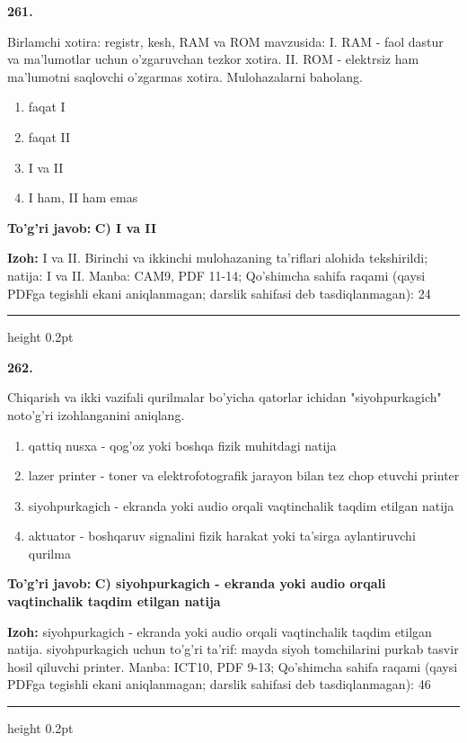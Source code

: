 \documentclass[10pt,a4paper]{article}
\begin{document}
{\bfseries\sffamily\color{ink} 261.}
\par
Birlamchi xotira: registr, kesh, RAM va ROM mavzusida: I. RAM - faol dastur va ma'lumotlar uchun o'zgaruvchan tezkor xotira. II. ROM - elektrsiz ham ma'lumotni saqlovchi o'zgarmas xotira. Mulohazalarni baholang.
\begin{enumerate}[label=\Alph*),leftmargin=9mm]
\item faqat I
\item faqat II
\item I va II
\item I ham, II ham emas
\end{enumerate}
\begin{tcolorbox}[enhanced,breakable,colback=teal!4,colframe=teal!60!black,boxrule=0.45pt,arc=1.2mm,left=2.7mm,right=2.7mm,top=1.8mm,bottom=1.8mm,before skip=2mm,after skip=2mm]
{\bfseries\sffamily\color{teal}To'g'ri javob:} \textbf{C) I va II}
\par\smallskip
{\bfseries Izoh:} I va II. Birinchi va ikkinchi mulohazaning ta'riflari alohida tekshirildi; natija: I va II. Manba: CAM9, PDF 11-14; Qo'shimcha sahifa raqami (qaysi PDFga tegishli ekani aniqlanmagan; darslik sahifasi deb tasdiqlanmagan): 24
\end{tcolorbox}
\vspace{2mm}\hrule height 0.2pt\vspace{3mm}

{\bfseries\sffamily\color{ink} 262.}
\par
Chiqarish va ikki vazifali qurilmalar bo'yicha qatorlar ichidan "siyohpurkagich" noto'g'ri izohlanganini aniqlang.
\begin{enumerate}[label=\Alph*),leftmargin=9mm]
\item qattiq nusxa - qog'oz yoki boshqa fizik muhitdagi natija
\item lazer printer - toner va elektrofotografik jarayon bilan tez chop etuvchi printer
\item siyohpurkagich - ekranda yoki audio orqali vaqtinchalik taqdim etilgan natija
\item aktuator - boshqaruv signalini fizik harakat yoki ta'sirga aylantiruvchi qurilma
\end{enumerate}
\begin{tcolorbox}[enhanced,breakable,colback=teal!4,colframe=teal!60!black,boxrule=0.45pt,arc=1.2mm,left=2.7mm,right=2.7mm,top=1.8mm,bottom=1.8mm,before skip=2mm,after skip=2mm]
{\bfseries\sffamily\color{teal}To'g'ri javob:} \textbf{C) siyohpurkagich - ekranda yoki audio orqali vaqtinchalik taqdim etilgan natija}
\par\smallskip
{\bfseries Izoh:} siyohpurkagich - ekranda yoki audio orqali vaqtinchalik taqdim etilgan natija. siyohpurkagich uchun to'g'ri ta'rif: mayda siyoh tomchilarini purkab tasvir hosil qiluvchi printer. Manba: ICT10, PDF 9-13; Qo'shimcha sahifa raqami (qaysi PDFga tegishli ekani aniqlanmagan; darslik sahifasi deb tasdiqlanmagan): 46
\end{tcolorbox}
\vspace{2mm}\hrule height 0.2pt\vspace{3mm}
\end{document}
